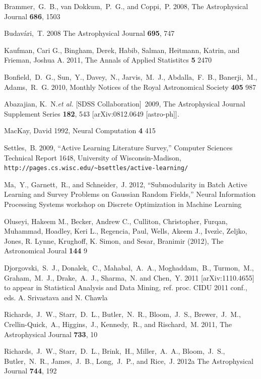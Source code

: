 \documentclass[prd,nofootbib,floatfix,11pt,tightenlines,nofootinbib]{revtex4}
\begin{document}
\begin{thebibliography}{99}
Brammer,~G.~B., van Dokkum,~P.~G., and Coppi,~P. 2008,
The Astrophysical Journal {\bf 686}, 1503


Budav\'ari,~T. 2008 The Astrophysical Journal {\bf 695}, 747

Kaufman, Cari G., Bingham, Derek, Habib, Salman, Heitmann, Katrin, and Frieman,
Joshua A. 2011, The Annals of Applied Statistitcs {\bf 5} 2470

Bonfield,~D.~G., Sun,~Y., Davey,~N., Jarvis,~M.~J., Abdalla,~F.~B.,
Banerji,~M., Adams,~R.~G. 2010, Monthly Notices of the Royal Astronomical Society 
{\bf 405} 987

  Abazajian, K.~N.{\it et al.}  [SDSS Collaboration]~2009,
  The Astrophysical Journal Supplement Series  {\bf 182}, 543
  [arXiv:0812.0649 [astro-ph]].

MacKay, David 1992, Neural Computation {\bf 4} 415

Settles,~B. 2009, ``Active Learning Literature Survey,'' Computer Sciences Technical
Report 1648, University of Wisconsin-Madison,
\verb|http://pages.cs.wisc.edu/~bsettles/active-learning/|

Ma,~Y., Garnett,~R., and Schneider,~J. 2012,
``Submodularity in Batch Active Learning and Survey Problems
on Gaussian Random Fields,''
Neural Information Processing Systems 
workshop on Discrete Optimization in Machine Learning

Oluseyi, Hakeem M., Becker, Andrew C., Culliton, Christopher, Furqan, Muhammad,
Hoadley, Keri L., Regencia, Paul, Wells, Akeem J., Ivez\`ic, Zeljko, Jones, R.
Lynne, Krughoff, K. Simon, and Sesar, Branimir (2012), The Astronomical Joural
{\bf 144} 9


Djorgovski,~S.~J., Donalek,~C., Mahabal,~A.~A., Moghaddam,~B., Turmon,~M.,
Graham,~M.~J., Drake,~A.~J., Sharma,~N. and Chen,~Y. 2011
[arXiv:1110.4655] to appear in Statistical Analysis and Data Mining, ref. proc.
CIDU 2011 conf., eds. A. Srivastava and N. Chawla

Richards,~J.~W., Starr,~D.~L., Butler,~N.~R., Bloom,~J.~S., Brewer,~J.~M.,
Crellin-Quick,~A., Higgins,~J., Kennedy,~R., and Rischard,~M. 2011,
The Astrophysical Journal {\bf 733}, 10

Richards,~J.~W., Starr,~D.~L., Brink,~H., Miller,~A.~A., Bloom,~J.~S.,
Butler,~N.~R., James,~J.~B., Long,~J.~P., and Rice,~J. 2012a
The Astrophysical Journal {\bf 744}, 192


\end{thebibliography}
\end{document}
